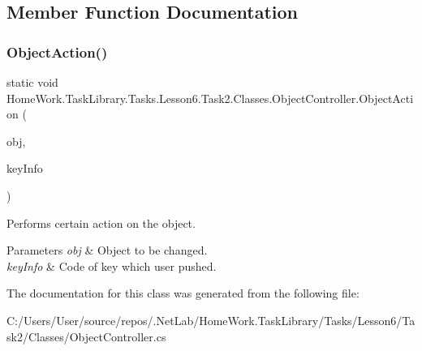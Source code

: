 \subsection{Member Function Documentation}
\mbox{\label{class_home_work_1_1_task_library_1_1_tasks_1_1_lesson6_1_1_task2_1_1_classes_1_1_object_controller_a463a1fe3b5c1ee2486d0310f43c194a8}} 
\subsubsection{\texorpdfstring{ObjectAction()}{ObjectAction()}}
{\footnotesize\ttfamily static void Home\+Work.\+Task\+Library.\+Tasks.\+Lesson6.\+Task2.\+Classes.\+Object\+Controller.\+Object\+Action (\begin{DoxyParamCaption}\item[{\mbox{\hyperlink{interface_home_work_1_1_task_library_1_1_tasks_1_1_lesson6_1_1_task2_1_1_interfaces_1_1_i_changeable}{I\+Changeable}}}]{obj,  }\item[{int}]{key\+Info }\end{DoxyParamCaption})\hspace{0.3cm}{\ttfamily [static]}}



Performs certain action on the object. 


\begin{DoxyParams}{Parameters}
{\em obj} & Object to be changed.\\
\hline
{\em key\+Info} & Code of key which user pushed.\\
\hline
\end{DoxyParams}


The documentation for this class was generated from the following file\+:\begin{DoxyCompactItemize}
\item 
C\+:/\+Users/\+User/source/repos/.\+Net\+Lab/\+Home\+Work.\+Task\+Library/\+Tasks/\+Lesson6/\+Task2/\+Classes/Object\+Controller.\+cs\end{DoxyCompactItemize}
